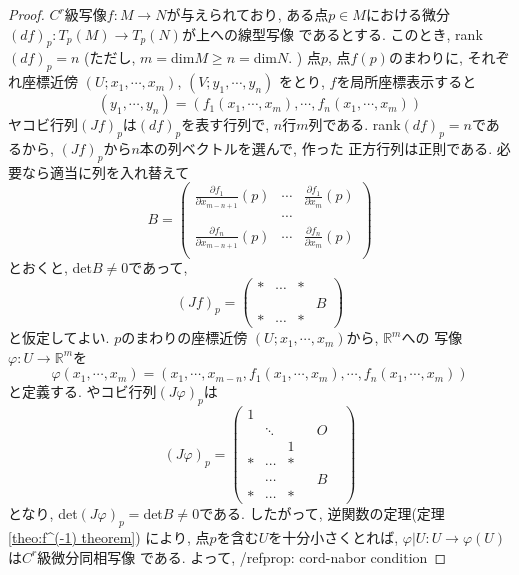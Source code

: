 \documentclass[a4j,12pt]{jarticle}
\theoremstyle{definition}
\begin{document}
\begin{proof}
    $C^r$級写像$f:M\to N$が与えられており, 
    ある点$p\in M$における微分
    $(df)_p:T_p(M)\to T_p(N)$が上への線型写像
    であるとする. このとき, rank$(df)_p=n$
    (ただし, $m=$dim$M\geq n=$dim$N$. )
    点$p$, 点$f(p)$のまわりに, それぞれ座標近傍
    $(U;x_1,\cdots ,x_m)$, $(V;y_1,\cdots ,y_n)$
    をとり, $f$を局所座標表示すると
    $$(y_1, \cdots ,y_n)=(f_1(x_1,\cdots ,x_m), 
    \cdots ,f_n(x_1,\cdots ,x_m))$$
    ヤコビ行列$(Jf)_p$は$(df)_p$を表す行列で, 
    $n$行$m$列である. rank$(df)_p=n$であるから, 
    $(Jf)_p$から$n$本の列ベクトルを選んで, 作った
    正方行列は正則である. 必要なら適当に列を入れ替えて
    $$B=
    \begin{pmatrix}
        \frac{\partial f_1}{\partial x_{m-n+1}}(p) & \cdots & \frac{\partial f_1}{\partial x_m}(p)  \\
        &\cdots& \\
        \frac{\partial f_n}{\partial x_{m-n+1}}(p) & \cdots & \frac{\partial f_n}{\partial x_m}(p)  \\
    \end{pmatrix}
    $$
    とおくと, det$B \neq 0$であって, 
    $$(Jf)_p=
    \left(
        \begin{array}{ccc|c} 
          * & \cdots & *  &  \\
           &  &   & B \\
          * & \cdots & *  & 
        \end{array} 
        \right)
$$
と仮定してよい. $p$のまわりの座標近傍
$(U;x_1,\cdots ,x_m)$から, $\mathbb{R}^m$への
写像$\varphi :U\to \mathbb{R}^m$を
$$\varphi(x_1,\cdots ,x_m)=(x_1, \cdots ,x_{m-n},f_1(x_1,\cdots ,x_m), 
\cdots ,f_n(x_1,\cdots ,x_m))$$
と定義する. やコビ行列$(J\varphi)_p$は
$$(J\varphi)_p=
    \left(
        \begin{array}{ccc|ccc} 
          1 &        &   & & & \\
            & \ddots &   & &O& \\
            &        & 1 & & &  \\ \hline
          * & \cdots & * & & &  \\
            & \cdots &   & &B& \\
          * & \cdots & * & & &
        \end{array} 
        \right)
$$
となり, det$(J\varphi)_p=$det$B\neq 0$である. 
したがって, 逆関数の定理(定理
\ref{theo:f^(-1) theorem})
により, 点$p$を含む$U$を十分小さくとれば, 
$\varphi |U:U\to \varphi(U)$は$C^r$級微分同相写像
である. よって, /ref{prop: cord-nabor condition}

\end{proof}
\end{document}
